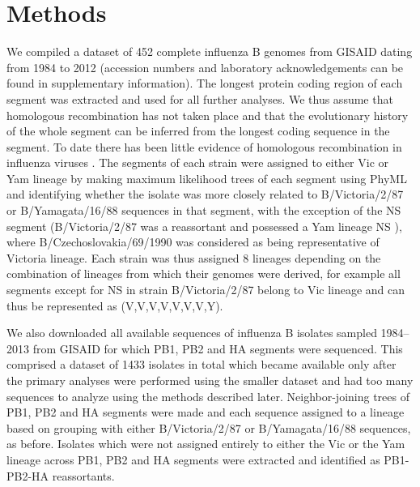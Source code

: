 \documentclass[11pt,oneside,letterpaper]{article}
\begin{document}
\section*{Methods}
We compiled a dataset of 452 complete influenza B genomes from GISAID \cite{GISAID} dating from 1984 to 2012 (accession numbers and laboratory acknowledgements can be found in supplementary information).
The longest protein coding region of each segment was extracted and used for all further analyses.
We thus assume that homologous recombination has not taken place and that the evolutionary history of the whole segment can be inferred from the longest coding sequence in the segment.
To date there has been little evidence of homologous recombination in influenza viruses \cite{chare2003,boni2008,han2010}.
The segments of each strain were assigned to either Vic or Yam lineage by making maximum likelihood trees of each segment using PhyML \cite{guindon2003} and identifying whether the isolate was more closely related to B/Victoria/2/87 or B/Yamagata/16/88 sequences in that segment, with the exception of the NS segment (B/Victoria/2/87 was a reassortant and possessed a Yam lineage NS \cite{lindstrom1999}), where B/Czechoslovakia/69/1990 was considered as being representative of Victoria lineage.
Each strain was thus assigned 8 lineages depending on the combination of lineages from which their genomes were derived, for example all segments except for NS in strain B/Victoria/2/87 belong to Vic lineage and can thus be represented as (V,V,V,V,V,V,V,Y).

We also downloaded all available sequences of influenza B isolates sampled 1984--2013 from GISAID for which PB1, PB2 and HA segments were sequenced.
This comprised a dataset of 1433 isolates in total which became available only after the primary analyses were performed using the smaller dataset and had too many sequences to analyze using the methods described later. 
Neighbor-joining trees \cite{saitou1987} of PB1, PB2 and HA segments were made and each sequence assigned to a lineage based on grouping with either B/Victoria/2/87 or B/Yamagata/16/88 sequences, as before.
Isolates which were not assigned entirely to either the Vic or the Yam lineage across PB1, PB2 and HA segments were extracted and identified as PB1-PB2-HA reassortants.
\end{document}
